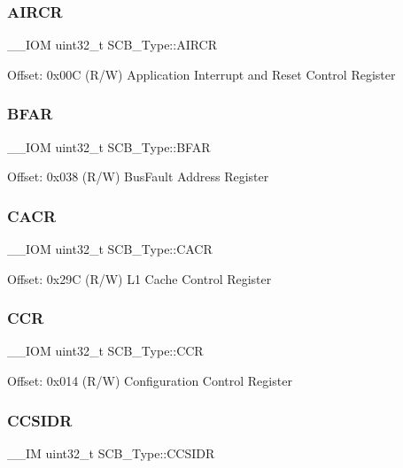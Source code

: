 \subsubsection{\texorpdfstring{AIRCR}{AIRCR}}
{\footnotesize\ttfamily \+\_\+\+\_\+\+I\+OM uint32\+\_\+t S\+C\+B\+\_\+\+Type\+::\+A\+I\+R\+CR}

Offset\+: 0x00C (R/W) Application Interrupt and Reset Control Register \mbox{\label{struct_s_c_b___type_a3f8e7e58be4e41c88dfa78f54589271c}} 
\subsubsection{\texorpdfstring{BFAR}{BFAR}}
{\footnotesize\ttfamily \+\_\+\+\_\+\+I\+OM uint32\+\_\+t S\+C\+B\+\_\+\+Type\+::\+B\+F\+AR}

Offset\+: 0x038 (R/W) Bus\+Fault Address Register \mbox{\label{struct_s_c_b___type_a51f9bd107a4e1d46ba647384e5c825b5}} 
\subsubsection{\texorpdfstring{CACR}{CACR}}
{\footnotesize\ttfamily \+\_\+\+\_\+\+I\+OM uint32\+\_\+t S\+C\+B\+\_\+\+Type\+::\+C\+A\+CR}

Offset\+: 0x29C (R/W) L1 Cache Control Register \mbox{\label{struct_s_c_b___type_a2d6653b0b70faac936046a02809b577f}} 
\subsubsection{\texorpdfstring{CCR}{CCR}}
{\footnotesize\ttfamily \+\_\+\+\_\+\+I\+OM uint32\+\_\+t S\+C\+B\+\_\+\+Type\+::\+C\+CR}

Offset\+: 0x014 (R/W) Configuration Control Register \mbox{\label{struct_s_c_b___type_afd063c9297a1a3b67e6d1d5e179e6a0e}} 
\subsubsection{\texorpdfstring{CCSIDR}{CCSIDR}}
{\footnotesize\ttfamily \+\_\+\+\_\+\+IM uint32\+\_\+t S\+C\+B\+\_\+\+Type\+::\+C\+C\+S\+I\+DR}

